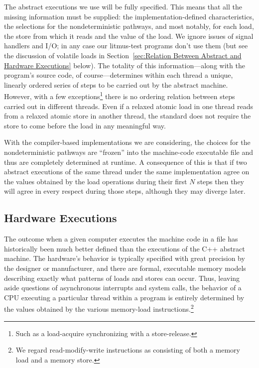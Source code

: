 The abstract executions we use will be fully specified.
This means that all the missing information must be supplied:
the implementation-defined characteristics, the selections for the
nondeterministic pathways, and most notably, for each load, the store
from which it reads and the value of the load.
We ignore issues of signal handlers and I/O;
in any case our litmus-test programs don't use them
(but see the discussion of volatile loads in
Section~\ref{sec:Relation Between Abstract and Hardware Executions} below).
The totality of this information---along with the program's source
code, of course---determines within each thread a unique, linearly
ordered series of steps to be carried out by the abstract machine.
However, with a few exceptions\footnote{
	Such as a load-acquire synchronizing with a store-release.}
there is no ordering relation between steps carried out
in different threads.
Even if a relaxed atomic load in one thread reads from a relaxed
atomic store in another thread, the standard does not require the
store to come before the load in any meaningful way.

With the compiler-based implementations we are considering,
the choices for the nondeterministic pathways are ``frozen'' into the
machine-code executable file and thus are completely determined
at runtime.
A consequence of this is that if two abstract executions of the same
thread under the same implementation agree on the values obtained by
the load operations during their first $N$ steps then they will agree
in every respect during those steps, although they may diverge later.

\subsection{Hardware Executions}
\label{sec:Hardware Executions}

The outcome when a given computer executes the machine code in a file
has historically been much better defined than the executions of the
C++ abstract machine.
The hardware's behavior is typically specified with great precision by
the designer or manufacturer, and there are formal, executable memory models
describing exactly what patterns of loads and stores can occur.
Thus, leaving aside questions of asynchronous interrupts and system
calls, the behavior of a CPU executing a particular thread within a
program is entirely determined by the values obtained by the various
memory-load instructions.\footnote{
	We regard read-modify-write instructions as consisting of both a
	memory load and a memory store.}

